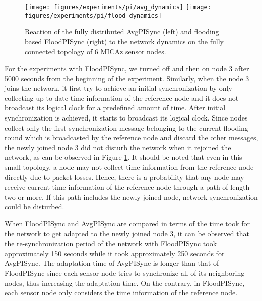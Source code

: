 \documentclass[english,a4paper,10pt,final]{article}
\numberwithin{equation}{section}
\numberwithin{figure}{section}
\begin{document}
\begin{figure}
\center

\texttt{[image: figures/experiments/pi/avg\_dynamics]}
\texttt{[image: figures/experiments/pi/flood\_dynamics]}

\caption{\label{fig:pi-dynamics} Reaction of the fully distributed AvgPISync (left) and flooding based FloodPISync (right) to the network dynamics on the fully connected topology of 6 MICAz sensor nodes. }

\end{figure}

For the experiments with FloodPISync, we turned off and then on node 3 after 5000 seconds from the beginning of the experiment. Similarly, when the node 3 joins the network, it first try to achieve an initial synchronization by only collecting up-to-date time information of the reference node and it does not broadcast its logical clock for a predefined amount of time. After initial synchronization is achieved, it starts to broadcast its logical clock. Since nodes collect only the first synchronization message belonging to the current flooding round which is broadcasted by the reference node and discard the other messages, the newly joined node 3 did not disturb the network when it rejoined the network, as can be observed in Figure \ref{fig:pi-dynamics}. It should be noted that even in this small topology, a node may not collect time information from the reference node directly due to packet losses. Hence, there is a probability that any node may receive current time information of the reference node through a path of length two or more. If this path includes the newly joined node, network synchronization could be disturbed.

When FloodPISync and AvgPISync are compared in terms of the time took for the network to get adapted to the newly joined node 3, it can be observed that the re-synchronization period of the network with FloodPISync took approximately 150 seconds while it took approximately 250 seconds for AvgPISync. The adaptation time of AvgPISync is longer than that of FloodPISync since each sensor node tries to synchronize all of its neighboring nodes, thus increasing the adaptation time. On the contrary, in FloodPISync, each sensor node only considers the time information of the reference node.
\end{document}

